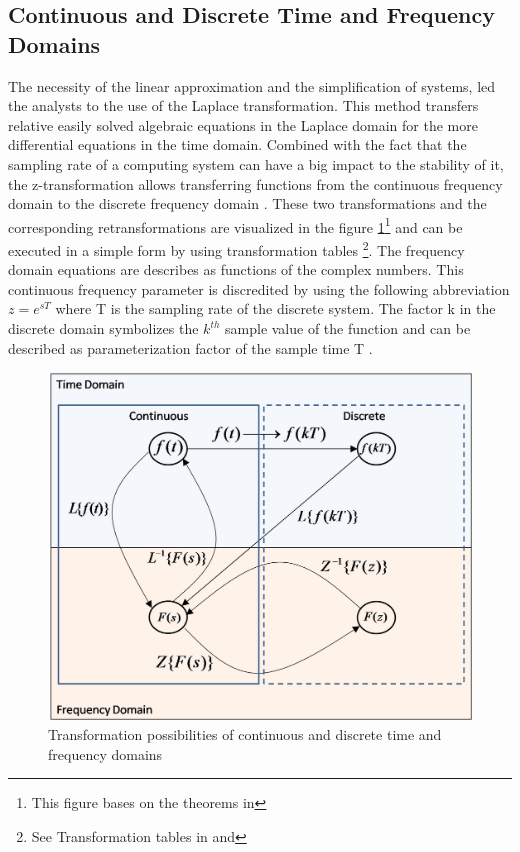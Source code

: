 \subsection{Continuous and Discrete Time and Frequency Domains}
The necessity of the linear approximation and the simplification of
systems, led the analysts to the use of the Laplace transformation. This method
transfers relative easily solved algebraic equations in the Laplace domain for
the more differential equations in the time domain. Combined with the fact that the sampling rate of a
computing system can have a big impact to the stability of it, the
z-transformation allows transferring functions from the continuous frequency
domain to the discrete frequency domain . These two transformations and the corresponding
retransformations are visualized in the figure
\ref{fig:TimeLaplaceAndZDomain.png}\footnote{This figure bases on the theorems in
} and can be executed in a simple form by using
transformation tables
 \footnote{See Transformation tables in  and }.
\newpage
The frequency domain equations are describes as
functions of the complex numbers. This continuous frequency parameter is discredited by using the
following abbreviation \ensuremath{z=e^{sT}} where T is the sampling rate of the
discrete system. The factor k in the discrete domain symbolizes the
\ensuremath{k^{th}} sample value of the function and can be described as
parameterization factor of the sample time T .


\begin{figure}[H]
	\centering
		\includegraphics[width=1\textwidth]{graphic/TimeLaplaceAndZDomain.png}
\caption{Transformation possibilities of continuous and discrete time and frequency domains}
	\label{fig:TimeLaplaceAndZDomain.png}
\end{figure}
\newpage
